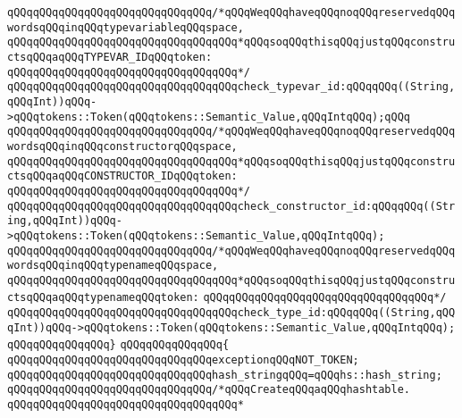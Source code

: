 \newline
\verb|qQQqqQQqqQQqqQQqqQQqqQQqqQQqqQQq/*qQQqWeqQQqhaveqQQqnoqQQqreservedqQQqwordsqQQqinqQQqtypevariableqQQqspace,|\newline
\verb|qQQqqQQqqQQqqQQqqQQqqQQqqQQqqQQqqQQq*qQQqsoqQQqthisqQQqjustqQQqconstructsqQQqaqQQqTYPEVAR_IDqQQqtoken:|\newline
\verb|qQQqqQQqqQQqqQQqqQQqqQQqqQQqqQQqqQQq*/|\newline
\verb|qQQqqQQqqQQqqQQqqQQqqQQqqQQqqQQqqQQqcheck_typevar_id:qQQqqQQq((String,qQQqInt))qQQq->qQQqtokens::Token(qQQqtokens::Semantic_Value,qQQqIntqQQq);qQQq|\newline
\newline
\verb|qQQqqQQqqQQqqQQqqQQqqQQqqQQqqQQq/*qQQqWeqQQqhaveqQQqnoqQQqreservedqQQqwordsqQQqinqQQqconstructorqQQqspace,|\newline
\verb|qQQqqQQqqQQqqQQqqQQqqQQqqQQqqQQqqQQq*qQQqsoqQQqthisqQQqjustqQQqconstructsqQQqaqQQqCONSTRUCTOR_IDqQQqtoken:|\newline
\verb|qQQqqQQqqQQqqQQqqQQqqQQqqQQqqQQqqQQq*/|\newline
\verb|qQQqqQQqqQQqqQQqqQQqqQQqqQQqqQQqqQQqcheck_constructor_id:qQQqqQQq((String,qQQqInt))qQQq->qQQqtokens::Token(qQQqtokens::Semantic_Value,qQQqIntqQQq);|\newline
\newline
\verb|qQQqqQQqqQQqqQQqqQQqqQQqqQQqqQQq/*qQQqWeqQQqhaveqQQqnoqQQqreservedqQQqwordsqQQqinqQQqtypenameqQQqspace,|\newline
\verb|qQQqqQQqqQQqqQQqqQQqqQQqqQQqqQQqqQQq*qQQqsoqQQqthisqQQqjustqQQqconstructsqQQqaqQQqtypenameqQQqtoken:|\newline
\verb|qQQqqQQqqQQqqQQqqQQqqQQqqQQqqQQqqQQq*/|\newline
\verb|qQQqqQQqqQQqqQQqqQQqqQQqqQQqqQQqqQQqcheck_type_id:qQQqqQQq((String,qQQqInt))qQQq->qQQqtokens::Token(qQQqtokens::Semantic_Value,qQQqIntqQQq);|\newline
\verb|qQQqqQQqqQQqqQQq}|\newline
\verb|qQQqqQQqqQQqqQQq{|\newline
\verb|qQQqqQQqqQQqqQQqqQQqqQQqqQQqqQQqexceptionqQQqNOT_TOKEN;|\newline
\newline
\verb|qQQqqQQqqQQqqQQqqQQqqQQqqQQqqQQqhash_stringqQQq=qQQqhs::hash_string;|\newline
\newline
\verb|qQQqqQQqqQQqqQQqqQQqqQQqqQQqqQQq/*qQQqCreateqQQqaqQQqhashtable.|\newline
\verb|qQQqqQQqqQQqqQQqqQQqqQQqqQQqqQQqqQQq*|\newline
